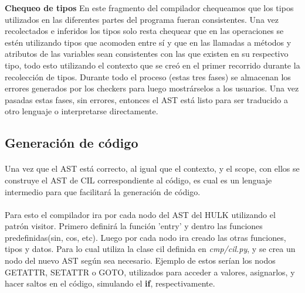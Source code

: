 \documentclass[12pt]{article}
\begin{document}
\textbf{Chequeo de tipos} En este fragmento del compilador chequeamos que los tipos utilizados en las diferentes partes del programa fueran consistentes. Una vez recolectados e inferidos los tipos solo resta chequear que en las operaciones se estén utilizando tipos que acomoden entre sí y que en las llamadas a métodos y atributos de las variables sean consistentes con las que existen en su respectivo tipo, todo esto utilizando el contexto que se creó en el primer recorrido durante la recolección de tipos. Durante todo el proceso (estas tres fases) se almacenan los errores generados por los checkers para luego mostrárselos a los usuarios. Una vez pasadas estas fases, sin errores, entonces el AST está listo para ser traducido a otro lenguaje o interpretarse directamente.


\subsection{Generación de código}
\paragraph{}
Una vez que el AST está correcto, al igual que el contexto, y el scope, con ellos se construye el AST de CIL correspondiente al código, es cual es un lenguaje intermedio para que facilitará la generación de código.
\paragraph{}
Para esto el compilador ira por cada nodo del AST del HULK utilizando el patrón visitor. Primero definirá la función 'entry' y dentro las funciones predefinidas(sin, cos, etc). Luego por cada nodo ira creado las otras funciones, tipos y datos. Para lo cual utiliza la clase cil definida en \textit{cmp/cil.py}, y se crea un nodo del nuevo AST según sea necesario. Ejemplo de estos serían los nodos GETATTR, SETATTR o GOTO, utilizados para acceder a valores, asignarlos, y hacer saltos en el código, simulando el \textbf{if}, respectivamente.
\end{document}
